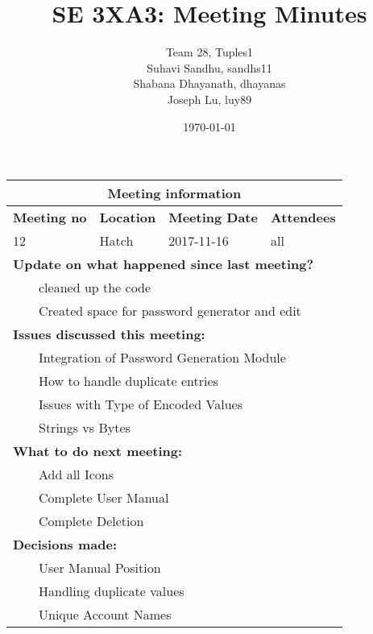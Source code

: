 \documentclass{article}
\title{SE 3XA3: Meeting Minutes}
\author{Team 28, Tuples1
		\\ Suhavi Sandhu, sandhs11
		\\ Shabana Dhayanath, dhayanas
		\\ Joseph Lu, luy89
}
\date{\today}
\newcommand{\tabitem}{~~\llap{\textbullet}~~}
\begin{document}
\begin{tabularx}{\textwidth}{| X || X || X || X |}

    \hline
    \hline
    \multicolumn{4}{|c|}{\textbf{Meeting information}}\\
    \hline
    \hline
        
    \textbf{Meeting no}& \textbf{Location}&\textbf{Meeting Date}&\textbf{Attendees}\\
    
    \hline

    12 & Hatch & 2017-11-16 & all\\
    
    \hline

    \multicolumn{4}{|l|}{\textbf{Update on what happened since last meeting?}}\\

    \multicolumn{4}{|l|}{\tabitem cleaned up the code}\\
    \multicolumn{4}{|l|}{\tabitem Created space for password generator and edit}\\

    \hline

    \multicolumn{4}{|l|}{\textbf{Issues discussed this meeting:}}\\
    
    \multicolumn{4}{|l|}{\tabitem Integration of Password Generation Module}\\
    \multicolumn{4}{|l|}{\tabitem How to handle duplicate entries}\\
    \multicolumn{4}{|l|}{\tabitem Issues with Type of Encoded Values}\\
    \multicolumn{4}{|l|}{\quad\tabitem Strings vs Bytes}\\

    \hline

    \multicolumn{4}{|l|}{\textbf{What to do next meeting:}}\\

    \multicolumn{4}{|l|}{\tabitem Add all Icons}\\
    \multicolumn{4}{|l|}{\tabitem Complete User Manual}\\
    \multicolumn{4}{|l|}{\tabitem Complete Deletion}\\

    \hline

    \multicolumn{4}{|l|}{\textbf{Decisions made:}}\\
    
    \multicolumn{4}{|l|}{\tabitem User Manual Position}\\
    \multicolumn{4}{|l|}{\tabitem Handling duplicate values}\\
    \multicolumn{4}{|l|}{\quad\tabitem Unique Account Names}\\

    \hline


\end{tabularx}
\end{document}
